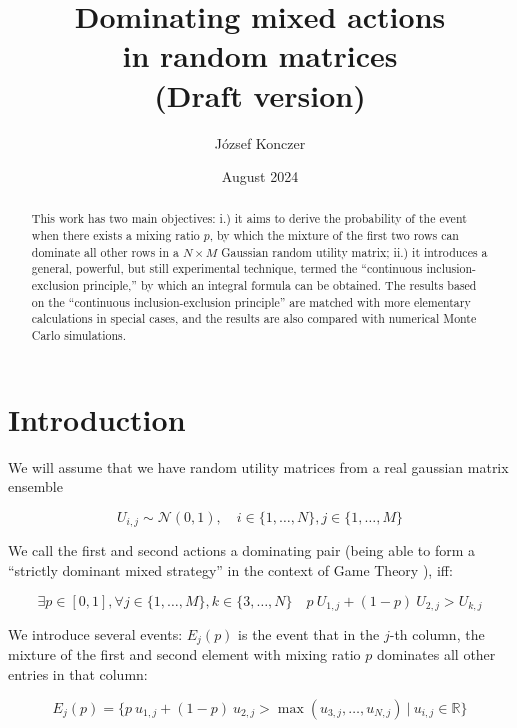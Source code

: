 \documentclass{article}
\title{Dominating mixed actions \\ in random matrices \\ (Draft version)}
\author{József Konczer}
\date{August 2024}
\theoremstyle{definition}
\begin{document}
\maketitle

\begin{abstract}
    This work has two main objectives: i.) it aims to derive the probability of the event when there exists a mixing ratio $p$, by which the mixture of the first two rows can dominate all other rows in a $N \times M$ Gaussian random utility matrix; ii.) it introduces a general, powerful, but still experimental technique, termed the ``continuous inclusion-exclusion principle,'' by which an integral formula can be obtained. The results based on the ``continuous inclusion-exclusion principle'' are matched with more elementary calculations in special cases, and the results are also compared with numerical Monte Carlo simulations.
\end{abstract}

\section{Introduction}

We will assume that we have random utility matrices from a
real gaussian matrix ensemble \cite{book:RandomMatrix}

\begin{equation}
    U_{i,j} \sim \mathcal{N}(0,1), \quad i \in \{1,\dots,N\}, j \in \{1,\dots,M\}
\end{equation}

We call the first and second actions a dominating pair (being able to form a ``strictly dominant mixed strategy'' \cite{book:GameTheory101} in the context of Game Theory \cite{book:EssentialGameTheory,book:GameTheory}), iff:

\begin{equation}
    \exists p \in [0,1],  \forall j \in \{1,\dots,M\}, k \in \{3,\dots,N\} \quad p \ U_{1,j} + (1-p) \ U_{2,j} > U_{k,j} 
\end{equation}

We introduce several events: $E_j(p)$ is the event that in the $j$-th column, the mixture of the first and second element with mixing ratio $p$ dominates all other entries in that column:

\begin{equation}
    E_j(p) = \{ p \ u_{1,j} + (1-p) \ u_{2,j} > \max(u_{3,j},\dots,u_{N,j}) \ | \ u_{i,j} \in \mathbb{R}\}
\end{equation}
\end{document}
